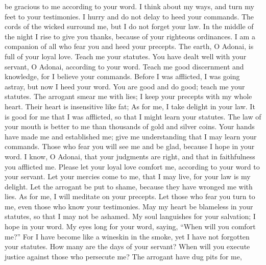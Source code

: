 \begin{biblechapter}
be gracious to me according to your word.
\verse I think about my ways, 
and turn my feet to your testimonies.
\verse I hurry and do not delay 
to heed your commands.
\verse The cords of the wicked surround me, 
but I do not forget your law.
\verse In the middle of the night I rise to give you thanks, 
because of your righteous ordinances.
\verse I am a companion of all who fear you 
and heed your precepts.
\verse The earth, O Adonai, is full of your loyal love. 
Teach me your statutes.
 You have dealt well with your servant, 
O Adonai, according to your word.
\verse Teach me good discernment and knowledge, 
for I believe your commands.
\verse Before I was afflicted, I was going astray, 
but now I heed your word.
\verse You are good and do good; 
teach me your statutes.
\verse The arrogant smear me with lies; 
I keep your precepts with my whole heart.
\verse Their heart is insensitive like fat; 
As for me, I take delight in your law.
\verse It is good for me that I was afflicted, 
so that I might learn your statutes.
\verse The law of your mouth is better to me 
than thousands of gold and silver coins.
 Your hands have made me and established me; 
give me understanding that I may learn your commands.
\verse Those who fear you will see me and be glad, 
because I hope in your word.
\verse I know, O Adonai, that your judgments are right, 
and that in faithfulness you afflicted me.
\verse Please let your loyal love comfort me, 
according to your word to your servant.
\verse Let your mercies come to me, that I may live, 
for your law is my delight.
\verse Let the arrogant be put to shame, 
because they have wronged me with lies. 
As for me, I will meditate on your precepts.
\verse Let those who fear you turn to me, 
even those who know your testimonies.
\verse May my heart be blameless in your statutes, 
so that I may not be ashamed.
 My soul languishes for your salvation; 
I hope in your word.
\verse My eyes long for your word, 
saying, “When will you comfort me?”
\verse For I have become like a wineskin in the smoke, 
yet I have not forgotten your statutes.
\verse How many are the days of your servant? 
When will you execute justice against those who persecute me?
\verse The arrogant have dug pits for me, 

\end{biblechapter}
